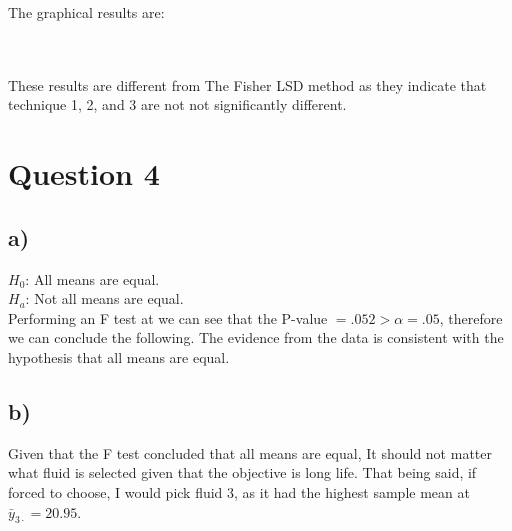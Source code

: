 \documentclass{article}
\begin{document}
The graphical results are: \\
\vspace{12pt}
\\
 \\

These results are different from The Fisher LSD method as they indicate that technique 1, 2, and 3 are not not significantly different.


\clearpage
\section*{Question 4}
\subsection*{a)}
$H_0$: All means are equal. \\
$H_a$: Not all means are equal. \\
Performing an F test at we can see that the P-value $ = .052 > \alpha = .05$, therefore we can conclude the following.
The evidence from the data is consistent with the hypothesis that all means are equal.

\subsection*{b)}
Given that the F test concluded that all means are equal, It should not matter what fluid is selected given that the objective is long life.
That being said, if forced to choose, I would pick fluid 3, as it had the highest sample mean at $\bar{y}_{3 \cdot} = 20.95$.
\end{document}
